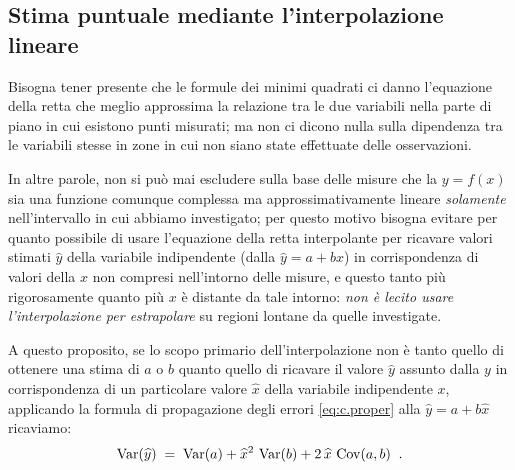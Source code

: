 \subsection{Stima puntuale mediante l'interpolazione
  lineare}
Bisogna tener presente che le formule dei minimi quadrati ci
danno l'equazione della retta che meglio approssima la
relazione tra le due variabili nella parte di piano in cui
esistono punti misurati; ma non ci dicono nulla sulla
dipendenza tra le variabili stesse in zone in cui non siano
state effettuate delle osservazioni.

In altre parole, non si pu\`o mai escludere sulla base delle
misure che la $y = f(x)$ sia una funzione comunque complessa
ma approssimativamente lineare \emph{solamente}
nell'intervallo in cui abbiamo investigato; per questo
motivo bisogna evitare per quanto possibile di usare
l'equazione della retta interpolante per ricavare valori
stimati $\widehat y$ della variabile indipendente (dalla
$\widehat y = a + b x$) in corrispondenza di valori della
$x$ non compresi nell'intorno delle misure, e questo tanto
pi\`u rigorosamente quanto pi\`u $x$ \`e distante da tale
intorno: \emph{non \`e lecito usare l'interpolazione per
  estrapolare} su regioni lontane da quelle investigate.

A questo proposito, se lo scopo primario dell'interpolazione
non \`e tanto quello di ottenere una stima di $a$ o $b$
quanto quello di ricavare il valore $\widehat y$ assunto
dalla $y$ in corrispondenza di un particolare valore
$\widehat x$ della variabile indipendente $x$, applicando la
formula di propagazione degli errori \eqref{eq:c.proper}
alla $\widehat y = a + b \widehat x$ ricaviamo:
\begin{equation*}
  \operatorname{Var}(\widehat y) \; = \; \operatorname{Var}(a) + {\widehat x}^2 \,
  \operatorname{Var}(b) + 2 \, \widehat x \, \operatorname{Cov}(a,b) \;\; .
\end{equation*}

